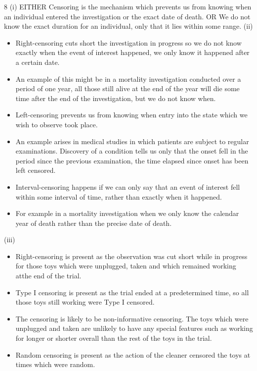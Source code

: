 \documentclass[a4paper,12pt]{article}
\begin{document}
\newpage
8
(i)
EITHER
Censoring is the mechanism which prevents us from knowing when an individual entered the investigation or the exact date of death.
OR
We do not know the exact duration for an individual, only that it lies within some range.
(ii)
\begin{itemize}
\item Right-censoring cuts short the investigation in progress so we do not know exactly when the event of interest happened, we only know it happened after a certain date.
\item An example of this might be in a mortality investigation conducted over a period of one year, all those still alive at the end of the year will die some time after the end of the investigation, but we do not know when.
\item Left-censoring prevents us from knowing when entry into the state which we wish to observe took place.
\item An example arises in medical studies in which patients are subject to regular examinations. Discovery of a condition tells us only that the onset fell in the period since the previous examination, the time elapsed since onset has been left censored.
\item Interval-censoring happens if we can only say that an event of interest fell within some interval of time, rather than exactly when it happened.
\item For example in a mortality investigation when we only know the calendar year of death rather than the precise date of death.
\end{itemize}
(iii)
\begin{itemize}
\item Right-censoring is present as the observation was cut short while in progress for those toys which were unplugged, taken and which remained working atthe end of the trial.
\item Type I censoring is present as the trial ended at a predetermined time, so all those toys still working were Type I censored.
\item The censoring is likely to be non-informative censoring. The toys which were unplugged and taken are unlikely to have any special features such as working for longer or shorter overall than the rest of the toys in the trial.
\item Random censoring is present as the action of the cleaner censored the toys at
times which were random.
\end{itemize}
\end{document}
